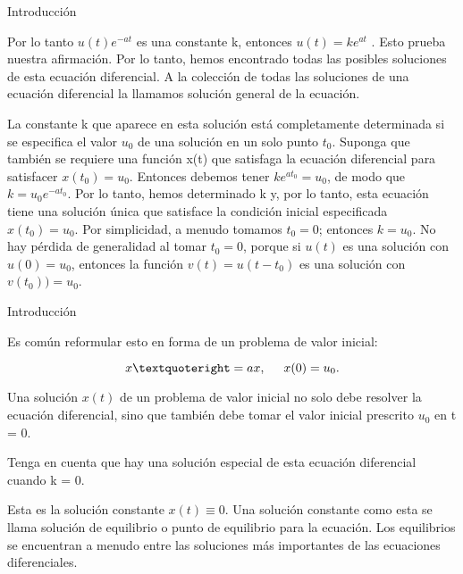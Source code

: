 \documentclass[11pt]{beamer}
\begin{document}
\begin{frame}{Introducción}
			\justifying
	
Por lo tanto $u(t )e^{-at}$ es una constante k, entonces $u(t) = ke^{at}$ . Esto prueba nuestra afirmación. Por lo tanto, hemos encontrado todas las posibles soluciones de esta ecuación diferencial. A la colección de todas las soluciones de una ecuación diferencial la llamamos solución general de la ecuación.

\hfill

La constante k que aparece en esta solución está completamente determinada si se especifica el valor $u_0$ de una solución en un solo punto $t_0$. Suponga que también se requiere una función x(t) que satisfaga la ecuación diferencial para satisfacer $x(t_0) = u_0$. Entonces debemos tener $ke^{at_0} = u_0$, de modo que $k = u_0e^{-at_0}$. Por lo tanto, hemos determinado k y, por lo tanto, esta ecuación tiene una solución única que satisface la condición inicial especificada $x(t_0) = u_0$. Por simplicidad, a menudo tomamos $t_0 = 0$; entonces $k = u_0$. No hay pérdida de generalidad al tomar $t_0 = 0$, porque si $u(t)$ es una solución con $u(0) = u_0$, entonces la función $v(t) = u(t - t_0)$ es una solución con $v(t_0) ) = u_0$.

		
\end{frame}

\begin{frame}{Introducción}
			\justifying
	
Es común reformular esto en forma de un problema de valor inicial:

\[
x’ = ax, \hspace{5mm} x(0) = u_0.
\]

Una solución $x(t)$ de un problema de valor inicial no solo debe resolver la ecuación diferencial, sino que también debe tomar el valor inicial prescrito $u_0$ en t = 0.

\hfill

Tenga en cuenta que hay una solución especial de esta ecuación diferencial cuando k = 0.

\hfill

Esta es la solución constante $x(t ) \equiv 0$. Una solución constante como esta se llama solución de equilibrio o punto de equilibrio para la ecuación. Los equilibrios se encuentran a menudo entre las soluciones más importantes de las ecuaciones diferenciales.

		
\end{frame}
\end{document}
